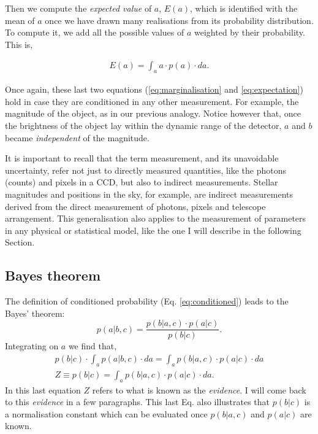 Then we compute the \emph{expected value} of $a$, $E(a)$, which is identified with the mean of $a$ once we have drawn many realisations from its probability distribution. To compute it, we add all the possible values of $a$ weighted by their probability. This is,

\begin{align}
\label{eq:expectation}
E(a)=\int_a a\cdot p(a)\cdot da.
\end{align}

Once again, these last two equations (\ref{eq:marginalisation} and \ref{eq:expectation}) hold in case they are conditioned in any other measurement. For example, the magnitude of the object, as in our previous analogy. Notice however that, once the brightness of the object lay within the dynamic range of the detector, $a$ and $b$ became \emph{independent} of the magnitude.

It is important to recall that the term measurement, and its unavoidable uncertainty, refer not just to directly measured quantities, like the photons (counts) and pixels in a CCD, but also to indirect measurements. Stellar magnitudes and positions in the sky, for example, are indirect measurements derived from the direct measurement of photons, pixels and telescope arrangement. This generalisation also applies to the measurement of parameters in any physical or statistical model, like the one I will describe in the following Section.

\subsection{Bayes theorem}
The definition of conditioned probability (Eq. \ref{eq:conditioned}) leads to the Bayes' theorem:
\begin{equation}
p(a|b,c) = \frac{p(b|a,c)\cdot p(a|c)}{p(b|c)}.
\end{equation}
Integrating on $a$ we find that,
\begin{align}
\label{eq:evidence}
p(b|c) \cdot \int_a p(a|b,c)\cdot da = \int_a p(b|a,c) \cdot p(a|c) \cdot da \nonumber \\
Z \equiv p(b|c) = \int_a p(b|a,c) \cdot p(a|c) \cdot da.
\end{align}
In this last equation $Z$ refers to what is known as the \emph{evidence}. I will come back to this \emph{evidence} in a few paragraphs. This last Eq. also illustrates that $p(b|c)$ is a normalisation constant which can be evaluated once $p(b|a,c)$ and $p(a|c)$ are known. 

